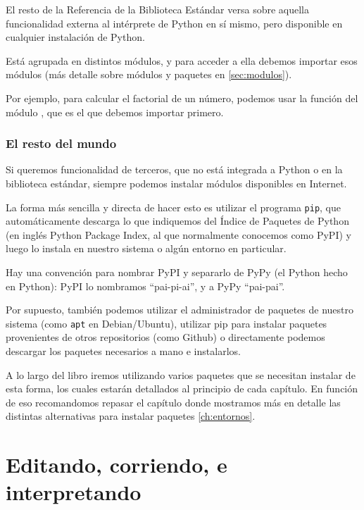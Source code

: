 El resto de la Referencia de la Biblioteca Estándar \cite{stdlib} versa sobre aquella funcionalidad externa al intérprete de Python en sí mismo, pero disponible en cualquier instalación de Python.

Está agrupada en distintos módulos, y para acceder a ella debemos importar esos módulos (más detalle sobre módulos y paquetes en \ref{sec:modulos}).

Por ejemplo, para calcular el factorial de un número, podemos usar la función  del módulo , que es el que debemos importar primero.


\subsubsection{El resto del mundo}\label{intro--modulos-resto}

Si queremos funcionalidad de terceros, que no está integrada a Python o en la biblioteca estándar, siempre podemos instalar módulos disponibles en Internet.

La forma más sencilla y directa de hacer esto es utilizar el programa \texttt{pip}, que automáticamente descarga lo que indiquemos del Índice de Paquetes de Python (en inglés Python Package Index, al que normalmente conocemos como PyPI) y luego lo instala en nuestro sistema o algún entorno en particular.

\begin{info}
Hay una convención para nombrar PyPI y separarlo de PyPy (el Python hecho en Python): PyPI lo nombramos ``pai-pi-ai'', y a PyPy ``pai-pai''.
\end{info}

Por supuesto, también podemos utilizar el administrador de paquetes de nuestro sistema (como \texttt{apt} en Debian/Ubuntu), utilizar pip para instalar paquetes provenientes de otros repositorios (como Github) o directamente podemos descargar los paquetes necesarios a mano e instalarlos.

A lo largo del libro iremos utilizando varios paquetes que se necesitan instalar de esta forma, los cuales estarán detallados al principio de cada capítulo. En función de eso recomandomos repasar el capítulo donde mostramos más en detalle las distintas alternativas para instalar paquetes \ref{ch:entornos}.


\section{Editando, corriendo, e interpretando}

